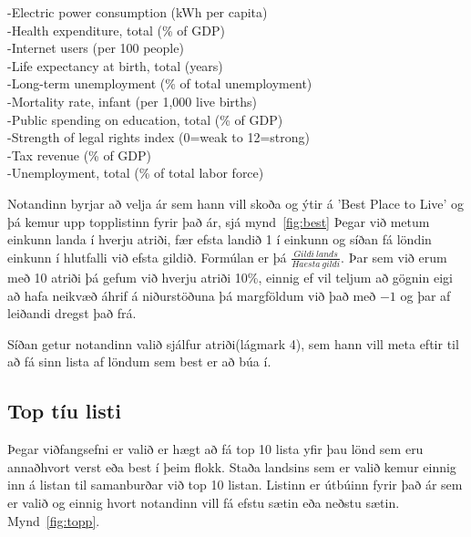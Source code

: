 \documentclass[11pt,a4paper]{amsart}
\theoremstyle{plain}
\theoremstyle{definition}
\theoremstyle{remark}
\begin{document}
-Electric power consumption (kWh per capita)\\
-Health expenditure, total (\% of GDP)\\
-Internet users (per 100 people)\\
-Life expectancy at birth, total (years)\\
-Long-term unemployment (\% of total unemployment)\\
-Mortality rate, infant (per 1,000 live births)\\
-Public spending on education, total (\% of GDP)\\
-Strength of legal rights index (0=weak to 12=strong)\\
-Tax revenue (\% of GDP)\\
-Unemployment, total (\% of total labor force)\\
\vspace{3mm}
\par
Notandinn byrjar að velja ár sem hann vill skoða og ýtir á 'Best Place to Live' og þá kemur upp topplistinn fyrir það ár, sjá mynd~\ref{fig:best}
Þegar við metum einkunn landa í hverju atriði, fær efsta landið 1 í einkunn og síðan fá löndin einkunn í hlutfalli við efsta gildið. Formúlan er þá $ \frac{Gildi\ lands}{Haesta\ gildi} $. Þar sem við erum með 10 atriði þá gefum við hverju atriði 10\%, einnig ef vil teljum að gögnin eigi að hafa neikvæð áhrif á niðurstöðuna þá margföldum við það með $ -1 $ og þar af leiðandi dregst það frá.\\\par
Síðan getur notandinn valið sjálfur atriði(lágmark 4), sem hann vill meta eftir til að fá sinn lista af löndum sem best er að búa í. 

\newpage

\subsection{Top tíu listi}
Þegar viðfangsefni er valið er hægt að fá top 10 lista yfir þau lönd sem eru annaðhvort verst eða best í þeim flokk. Staða landsins sem er valið kemur einnig inn á listan til samanburðar við top 10 listan. Listinn er útbúinn fyrir það ár sem er valið og einnig hvort notandinn vill fá efstu sætin eða neðstu sætin. Mynd~\ref{fig:topp}.
\\
\end{document}
